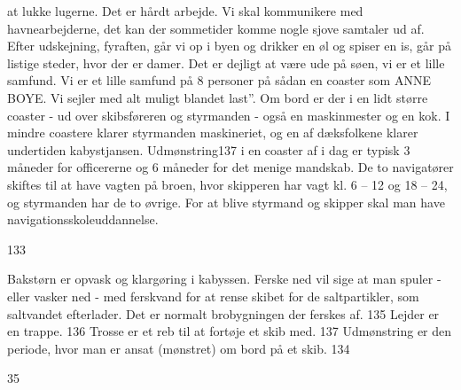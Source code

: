 at lukke lugerne. Det er hårdt arbejde. Vi skal kommunikere med
havnearbejderne, det kan der sommetider komme nogle sjove samtaler ud
af. Efter udskejning, fyraften, går vi op i byen og drikker en øl og
spiser en is, går på listige steder, hvor der er damer. Det er dejligt
at være ude på søen, vi er et lille samfund. Vi er et lille samfund på 8
personer på sådan en coaster som ANNE BOYE. Vi sejler med alt muligt
blandet last''. Om bord er der i en lidt større coaster - ud over
skibsføreren og styrmanden - også en maskinmester og en kok. I mindre
coastere klarer styrmanden maskineriet, og en af dæksfolkene klarer
undertiden kabystjansen. Udmønstring137 i en coaster af i dag er typisk
3 måneder for officererne og 6 måneder for det menige mandskab. De to
navigatører skiftes til at have vagten på broen, hvor skipperen har vagt
kl. 6 -- 12 og 18 -- 24, og styrmanden har de to øvrige. For at blive
styrmand og skipper skal man have navigationsskoleuddannelse.

133

Bakstørn er opvask og klargøring i kabyssen. Ferske ned vil sige at man
spuler - eller vasker ned - med ferskvand for at rense skibet for de
saltpartikler, som saltvandet efterlader. Det er normalt brobygningen
der ferskes af. 135 Lejder er en trappe. 136 Trosse er et reb til at
fortøje et skib med. 137 Udmønstring er den periode, hvor man er ansat
(mønstret) om bord på et skib. 134

35
